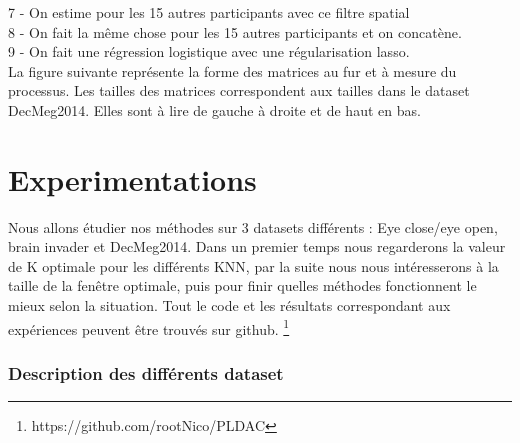 \documentclass{article}[12pt]
\begin{document}
7 - On estime pour les 15 autres participants avec ce filtre spatial\\
8 - On fait la même chose pour les 15 autres participants et on concatène.\\
9 - On fait une régression logistique avec une régularisation lasso.\\
La figure suivante représente la forme des matrices au fur et à mesure du processus. Les tailles des matrices correspondent aux tailles dans le dataset DecMeg2014. Elles sont à lire de gauche à droite et de haut en bas.
\\


\part{Experimentations}
Nous allons étudier nos méthodes sur 3 datasets différents : Eye close/eye open, brain invader et DecMeg2014. Dans un premier temps nous regarderons la valeur de K optimale pour les différents KNN, par la suite nous nous intéresserons à la taille de la fenêtre optimale, puis pour finir quelles méthodes fonctionnent le mieux selon la situation. Tout le code et les résultats correspondant aux expériences peuvent être trouvés sur github. \footnote{https://github.com/rootNico/PLDAC}
\section{Description des différents dataset}
\end{document}
